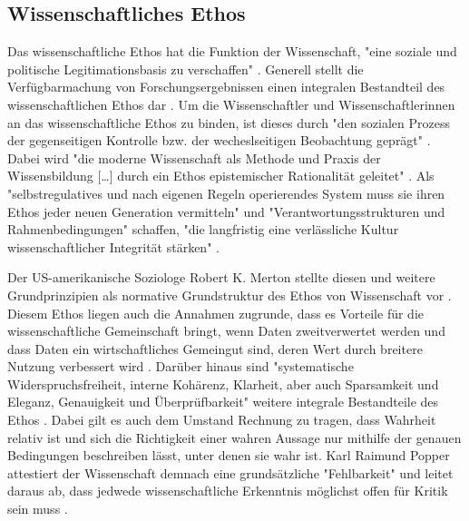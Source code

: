 \subsection{Wissenschaftliches Ethos}

Das wissenschaftliche Ethos hat die Funktion der Wissenschaft, "eine soziale und politische Legitimationsbasis zu verschaffen" \cite{Descher_2012}. Generell stellt die Verfügbarmachung von Forschungsergebnissen einen integralen Bestandteil des wissenschaftlichen Ethos dar \cite{Fangerau_2014} \cite[:67]{Winterhager_2014}. Um die Wissenschaftler und Wissenschaftlerinnen an das wissenschaftliche Ethos zu binden, ist dieses durch "den sozialen Prozess der gegenseitigen Kontrolle bzw. der wecheslseitigen Beobachtung geprägt" \cite[:68]{Winterhager_2014}. Dabei wird "die moderne Wissenschaft als Methode und Praxis der Wissensbildung […] durch ein Ethos epistemischer Rationalität geleitet" \cite[:67]{Oezmen_2015}. Als "selbstregulatives und nach eigenen Regeln operierendes System muss sie ihren Ethos jeder neuen Generation vermitteln" und "Verantwortungsstrukturen und Rahmenbedingungen" schaffen, "die langfristig eine verlässliche Kultur wissenschaftlicher Integrität stärken" \cite[:7]{Wissenschaftsrat_2015}.

Der US-amerikanische Soziologe Robert K. Merton stellte diesen und weitere Grundprinzipien als normative Grundstruktur des Ethos von Wissenschaft vor \cite{Merton_1985}. Diesem Ethos liegen auch die Annahmen zugrunde, dass es Vorteile für die wissenschaftliche Gemeinschaft bringt, wenn Daten zweitverwertet werden und dass Daten ein wirtschaftliches Gemeingut sind, deren Wert durch breitere Nutzung verbessert wird \cite{RIN_2010}. Darüber hinaus sind "systematische Widerspruchsfreiheit, interne Kohärenz, Klarheit, aber auch Sparsamkeit und Eleganz, Genauigkeit und Überprüfbarkeit" weitere integrale Bestandteile des Ethos \cite[:67]{Oezmen_2015}. Dabei gilt es auch dem Umstand Rechnung zu tragen, dass Wahrheit relativ ist und sich die Richtigkeit einer wahren Aussage nur mithilfe der genauen Bedingungen beschreiben lässt, unter denen sie wahr ist. Karl Raimund Popper attestiert der Wissenschaft demnach eine grundsätzliche "Fehlbarkeit" und leitet daraus ab, dass jedwede wissenschaftliche Erkenntnis möglichst offen für Kritik sein muss \cite{Popper_2005}.

